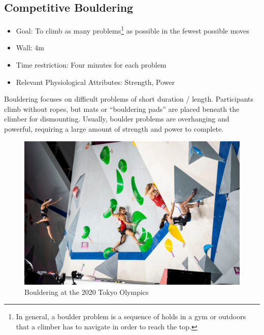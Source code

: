 \subsection{Competitive Bouldering}
\begin{itemize}
    \item Goal: To climb as many problems\footnote{In general, a boulder problem is a sequence of holds in a gym or outdoors that a climber has to navigate in order to reach the top.} as possible in the fewest possible moves
    \item Wall: 4m
    \item Time restriction: Four minutes for each problem
    \item Relevant Physiological Attributes: Strength, Power
    \end{itemize}
    Bouldering focuses on difficult problems of short duration / length. Participants climb without ropes, but mats or “bouldering pads” are placed beneath the climber for dismounting. Usually, boulder problems are overhanging and powerful, requiring a large amount of strength and power to complete.
    \begin{figure}
        \centering
        \includegraphics[width=0.9\linewidth]{figs/comp_bouldering.jpg}
        \caption{Bouldering at the 2020 Tokyo Olympics \citep{Branch_2021}}
    \end{figure}
